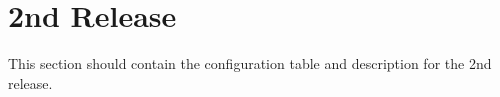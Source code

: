 \section{2nd Release}
This section should contain the configuration table and description for the 2nd release.